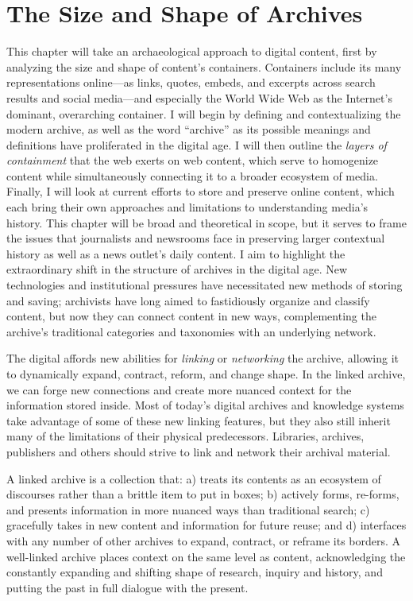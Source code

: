 \chapter{The Size and Shape of Archives}


This chapter will take an archaeological approach to digital content, first by analyzing the size and shape of content's containers. Containers include its many representations online---as links, quotes, embeds, and excerpts across search results and social media---and especially the World Wide Web as the Internet's dominant, overarching container. I will begin by defining and contextualizing the modern archive, as well as the word ``archive'' as its possible meanings and definitions have proliferated in the digital age. I will then outline the \emph{layers of containment} that the web exerts on web content, which serve to homogenize content while simultaneously connecting it to a broader ecosystem of media. Finally, I will look at current efforts to store and preserve online content, which each bring their own approaches and limitations to understanding media's history. This chapter will be broad and theoretical in scope, but it serves to frame the issues that journalists and newsrooms face in preserving larger contextual history as well as a news outlet's daily content. I aim to highlight the extraordinary shift in the structure of archives in the digital age. New technologies and institutional pressures have necessitated new methods of storing and saving; archivists have long aimed to fastidiously organize and classify content, but now they can connect content in new ways, complementing the archive's traditional categories and taxonomies with an underlying network.

The digital affords new abilities for \emph{linking} or \emph{networking} the archive, allowing it to dynamically expand, contract, reform, and change shape. In the linked archive, we can forge new connections and create more nuanced context for the information stored inside. Most of today's digital archives and knowledge systems take advantage of some of these new linking features, but they also still inherit many of the limitations of their physical predecessors. Libraries, archives, publishers and others should strive to link and network their archival material.

A linked archive is a collection that: a) treats its contents as an ecosystem of discourses rather than a brittle item to put in boxes; b) actively forms, re-forms, and presents information in more nuanced ways than traditional search; c) gracefully takes in new content and information for future reuse; and d) interfaces with any number of other archives to expand, contract, or reframe its borders. A well-linked archive places context on the same level as content, acknowledging the constantly expanding and shifting shape of research, inquiry and history, and putting the past in full dialogue with the present.

